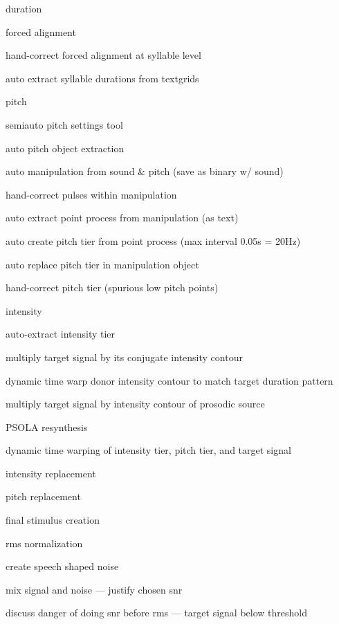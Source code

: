 \begin{itm}
	\item{duration}
	\begin{itm}
		\item{forced alignment}
		\item{hand-correct forced alignment at syllable level}
		\item{auto extract syllable durations from textgrids}
	\end{itm}
	\item{pitch}
	\begin{itm}
		\item{semiauto pitch settings tool}
		\item{auto pitch object extraction}
		\item{auto manipulation from sound \& pitch (save as binary w/ sound)}
		\item{hand-correct pulses within manipulation}
		\item{auto extract point process from manipulation (as text)}
		\item{auto create pitch tier from point process (max interval 0.05s = 20Hz)}
		\item{auto replace pitch tier in manipulation object}
		\item{hand-correct pitch tier (spurious low pitch points)}
	\end{itm}
	\item{intensity}
	\begin{itm}
		\item{auto-extract intensity tier}
		\item{multiply target signal by its conjugate intensity contour}
		\item{dynamic time warp donor intensity contour to match target duration pattern}
		\item{multiply target signal by intensity contour of prosodic source}
	\end{itm}
	\item{PSOLA resynthesis}
	\begin{itm}
		\item{dynamic time warping of intensity tier, pitch tier, and target signal}
		\item{intensity replacement}
		\item{pitch replacement}
	\end{itm}
	\item{final stimulus creation}	
	\begin{itm}
		\item{\ac{rms} normalization}
		\item{create speech shaped noise}
		\item{mix signal and noise — justify chosen \ac{snr}}
		\item{discuss danger of doing \ac{snr} before \ac{rms} — target signal below threshold}
	\end{itm}
\end{itm}


